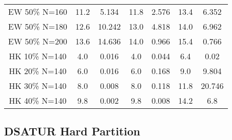 \documentclass[landscape, 12pt]{report}
\begin{document}
\begin{tabular}{|c|cc|cc|cc|}
	EW 50\% N=160 & 11.2 & 5.134 & 11.8 & 2.576 & 13.4 & 6.352
	\\
	EW 50\% N=180 & 12.6 & 10.242 & 13.0 & 4.818 & 14.0 & 6.962
	\\
	EW 50\% N=200 & 13.6 & 14.636 & 14.0 & 0.966 & 15.4 & 0.766
	\\
	\hline
	HK 10\% N=140 &  4.0 & 0.016 &  4.0 & 0.044 &  6.4 & 0.02
	\\
	HK 20\% N=140 &  6.0 & 0.016 &  6.0 & 0.168 &  9.0 & 9.804
	\\
	HK 30\% N=140 &  8.0 & 0.008 &  8.0 & 0.118 & 11.8 & 20.746
	\\
	HK 40\% N=140 &  9.8 & 0.002 &  9.8 & 0.008 & 14.2 &  6.8
	\\
	\hline 
	 \end{tabular}
	
	\subsection{DSATUR Hard Partition}
	
\end{document}
